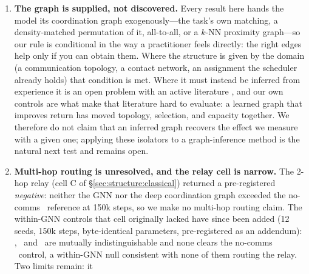 \begin{enumerate}[leftmargin=*,itemsep=0pt,topsep=2pt]
        whether the benefit degrades gracefully or cliffs as the graph drifts
        from correct. The graded sweep this needs is pre-registered but not
        run (\texttt{results/phaseE\_misspec/PREREGISTRATION.md}, committed
        before submission). Note that the density-matched constraint bounds
        which levels exist at all: a 1-regular graph cannot agree with the
        task matching on exactly $m{-}1$ of its $m$ edges, so at $N{=}10$ the
        achievable grid is $p\in\{0,0.2,0.4,0.6,1\}$ rather than an evenly
        spaced one. Turning the binary right-vs-wrong contrast into a graded
        mis-specification-cost curve remains the cheapest decision-relevant
        extension.
  \item \textbf{The graph is supplied, not discovered.} Every result here hands
        the model its coordination graph exogenously---the task's own matching,
        a density-matched permutation of it, all-to-all, or a $k$-NN proximity
        graph---so our rule is conditional in the way a practitioner feels
        directly: the right edges help only if you can obtain them. Where the
        structure is given by the domain (a communication topology, a contact
        network, an assignment the scheduler already holds) that condition is
        met. Where it must instead be inferred from experience it is an open
        problem with an active literature
        \citep{duan_2024_ltscg,duan_2024_gacg,gupta_2026_dmcg}, and our own
        controls are what make that literature hard to evaluate: a learned
        graph that improves return has moved topology, selection, and capacity
        together. We therefore do not claim that an inferred graph recovers the
        effect we measure with a given one; applying these isolators to a
        graph-inference method is the natural next test and remains open.
  \item \textbf{Multi-hop routing is unresolved, and the relay cell is
        narrow.} The 2-hop relay (cell C of \S\ref{sec:structure:classical})
        returned a pre-registered \emph{negative}: neither the GNN nor the deep
        coordination graph exceeded the no-comms \mlpqmix\ reference at 150k
        steps, so we make no multi-hop routing claim. The within-GNN controls
        that cell originally lacked have since been added (12 seeds, 150k
        steps, byte-identical parameters, pre-registered as an addendum):
        \gtrue, \gwrong\ and \gcomplete\ are mutually indistinguishable and
        none clears the no-comms \mlpqmix\ control, a within-GNN null
        consistent with none of them routing the relay. Two limits remain: it

\end{enumerate}
